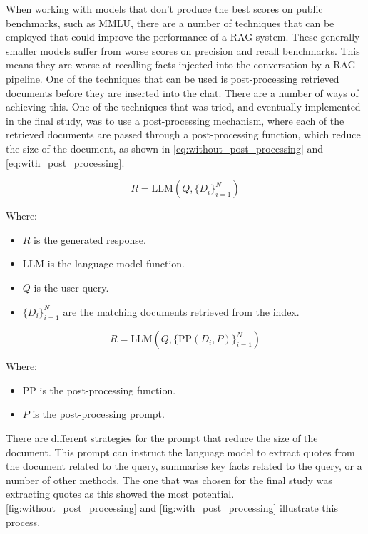 When working with models that don’t produce the best scores on public benchmarks, such as \gls{MMLU}, there are a number of techniques that can be employed that could improve the performance of a \gls{RAG} system. These generally smaller models suffer from worse scores on precision and recall benchmarks. This means they are worse at recalling facts injected into the conversation by a \gls{RAG} pipeline. One of the techniques that can be used is post-processing retrieved documents before they are inserted into the chat. There are a number of ways of achieving this. One of the techniques that was tried, and eventually implemented in the final study, was to use a post-processing mechanism, where each of the retrieved documents are passed through a post-processing function, which reduce the size of the document, as shown in \autoref{eq:without_post_processing} and \autoref{eq:with_post_processing}.


\begin{equation}
R = \text{LLM}\left(Q, \{D_i\}_{i=1}^N\right)
\label{eq:without_post_processing}
\end{equation}


Where:
\begin{itemize}
        \item \( R \) is the generated response.
        \item \( \text{LLM} \) is the language model function.
        \item \( Q \) is the user query.
        \item \( \{D_i\}_{i=1}^N \) are the matching documents retrieved from the index.
\end{itemize}


\begin{equation}
R = \text{LLM}\left(Q, \{\text{PP}(D_i, P)\}_{i=1}^N\right)
\label{eq:with_post_processing}
\end{equation}


Where:
\begin{itemize}
        \item \( \text{PP} \) is the post-processing function.
        \item \( P \) is the post-processing prompt.
\end{itemize}


There are different strategies for the prompt that reduce the size of the document. This prompt can instruct the language model to extract quotes from the document related to the query, summarise key facts related to the query, or a number of other methods. The one that was chosen for the final study was extracting quotes as this showed the most potential. \autoref{fig:without_post_processing} and \autoref{fig:with_post_processing} illustrate this process.


